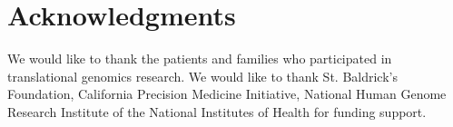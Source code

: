 \documentclass[10pt,letterpaper]{article}
\begin{document}
\section*{Acknowledgments}
We would like to thank the patients and families who participated in translational genomics research. We would like to thank St. Baldrick's Foundation, California Precision Medicine Initiative, National Human Genome Research Institute of the National Institutes of Health for funding support.

\nolinenumbers

%
%
% 




\end{document}
